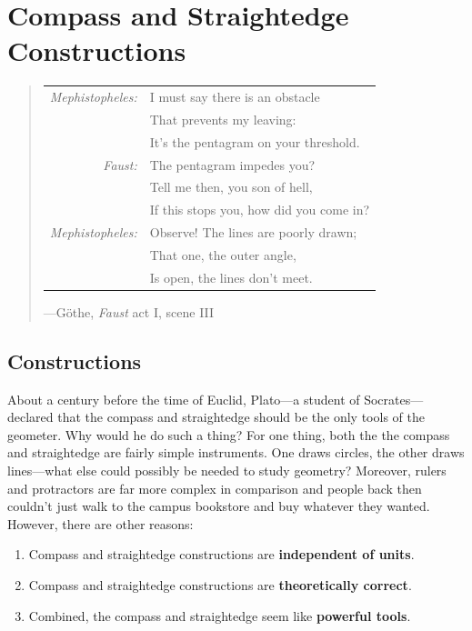 \chapter{Compass and Straightedge Constructions}
\begin{quote} 
\begin{tabular}{rl}
\textit{Mephistopheles:} & I must say there is an obstacle \\
                         & That prevents my leaving:\\
                         & It's the pentagram on your threshold.\\
\textit{Faust:}          & The pentagram impedes you? \\
                         & Tell me then, you son of hell,\\
                         & If this stops you, how did you come in?\\
\textit{Mephistopheles:} & Observe! The lines are poorly drawn;\\
                         & That one, the outer angle, \\
                         & Is open, the lines don't meet.
\end{tabular}

\hfill---G\"othe, \textit{Faust} act I, scene III
\end{quote}

\section{Constructions}

About a century before the time of Euclid,
Plato---a student of Socrates---declared
that the compass and straightedge should be the only tools of the
geometer. Why would he do such a thing? For one thing, both the the
compass and straightedge are fairly simple instruments. One draws
circles, the other draws lines---what else could possibly be needed to
study geometry? Moreover, rulers and protractors are far more complex
in comparison and people back then couldn't just walk to the campus
bookstore and buy whatever they wanted. However, there are other
reasons:
\begin{enumerate}        
\item Compass and straightedge constructions are \textbf{independent
  of units}.
\item Compass and straightedge constructions are \textbf{theoretically
  correct}.
\item Combined, the compass and straightedge seem like
  \textbf{powerful tools}.
\end{enumerate}



